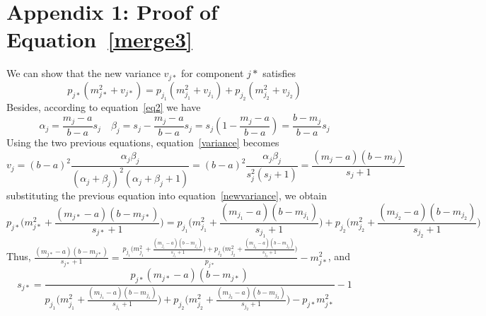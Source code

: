 \documentclass[journal,10pt]{elsart}
\begin{document}
\section*{Appendix 1: Proof of Equation~\ref{merge3}}\label{appendix1}
We can show that the new variance $v_{j*}$ for component $j*$ satisfies \cite{Green1997}
\begin{equation}\label{newvariance}
p_{j*}(m_{j*}^2+v_{j*})=p_{j_1}(m_{j_1}^2+v_{j_1})+p_{j_2}(m_{j_2}^2+v_{j_2})
\end{equation}
Besides, according to equation~\ref{eq2} we have
\begin{equation*}
\alpha_j=\frac{m_j-a}{b-a}s_j \quad \beta_j=s_j-\frac{m_j-a}{b-a}s_j=s_j(1-\frac{m_j-a}{b-a})=\frac{b-m_j}{b-a}s_j
\end{equation*}
Using the two previous equations, equation~\ref{variance}  becomes
\begin{equation}\label{vvalue}
v_j=(b-a)^2\frac{\alpha_j\beta_j}{(\alpha_j+\beta_j)^2(\alpha_j+\beta_j+1)}=(b-a)^2\frac{\alpha_j\beta_j}{s_j^2(s_j+1)}=\frac{(m_j-a)(b-m_j)}{s_j+1}
\end{equation}
substituting the previous equation into equation~\ref{newvariance}, we obtain
\begin{equation*}
p_{j*}\bigg(m_{j*}^2+\frac{(m_{j*}-a)(b-m_{j*})}{s_{j*}+1}\bigg)=p_{j_1}\bigg(m_{j_1}^2+\frac{(m_{j_1}-a)(b-m_{j_1})}{s_{j_1}+1}\bigg)+p_{j_2}\bigg(m_{j_2}^2+\frac{(m_{j_2}-a)(b-m_{j_2})}{s_{j_2}+1}\bigg)
\end{equation*}
Thus,
$
\frac{(m_{j*}-a)(b-m_{j*})}{s_{j*}+1}=\frac{p_{j_1}\bigg(m_{j_1}^2+\frac{(m_{j_1}-a)(b-m_{j_1})}{s_{j_1}+1}\bigg)+p_{j_2}\bigg(m_{j_2}^2+\frac{(m_{j_2}-a)(b-m_{j_2})}{s_{j_2}+1}\bigg)}{p_{j*}}-m_{j*}^2$, and
\begin{equation*}
s_{j*}=\frac{p_{j*}(m_{j*}-a)(b-m_{j*})}{p_{j_1}\bigg(m_{j_1}^2+\frac{(m_{j_1}-a)(b-m_{j_1})}{s_{j_1}+1}\bigg)+p_{j_2}\bigg(m_{j_2}^2+\frac{(m_{j_2}-a)(b-m_{j_2})}{s_{j_2}+1}\bigg)-p_{j*}m_{j*}^2}-1
\end{equation*}
\end{document}
